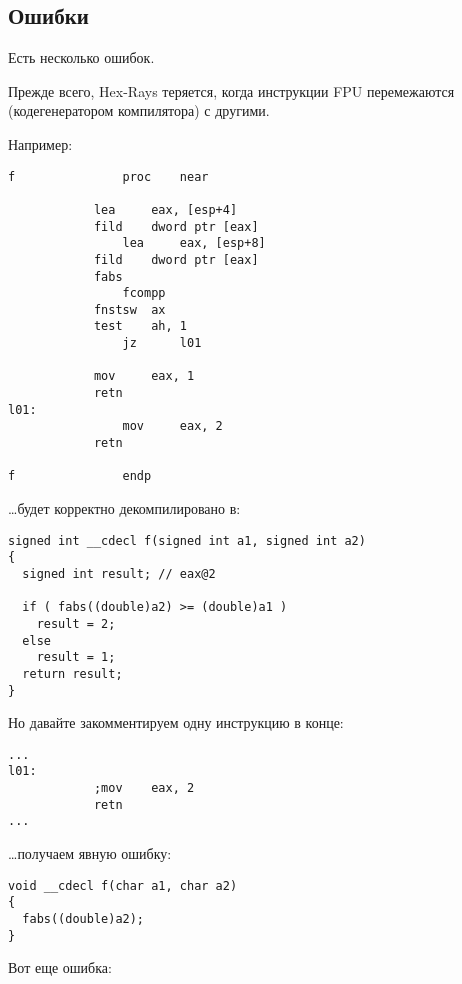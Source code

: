 \label{hex_rays}

\subsection{Ошибки}

Есть несколько ошибок.

Прежде всего, Hex-Rays теряется, когда инструкции \ac{FPU} перемежаются (кодегенератором компилятора) с другими.

Например:

\begin{lstlisting}[style=customasmx86]
f               proc    near

        	lea     eax, [esp+4]
	        fild    dword ptr [eax]
                lea     eax, [esp+8]
        	fild    dword ptr [eax]
	        fabs
                fcompp
        	fnstsw  ax
	        test    ah, 1
                jz      l01

        	mov     eax, 1
	        retn
l01:
                mov     eax, 2
	        retn

f               endp
\end{lstlisting}

\dots будет корректно декомпилировано в:

\begin{lstlisting}[style=customc]
signed int __cdecl f(signed int a1, signed int a2)
{
  signed int result; // eax@2

  if ( fabs((double)a2) >= (double)a1 )
    result = 2;
  else
    result = 1;
  return result;
}
\end{lstlisting}

Но давайте закомментируем одну инструкцию в конце:

\begin{lstlisting}[style=customasmx86]
...
l01:
	        ;mov    eax, 2
        	retn
...
\end{lstlisting}

\dots получаем явную ошибку:

\begin{lstlisting}[style=customc]
void __cdecl f(char a1, char a2)
{
  fabs((double)a2);
}
\end{lstlisting}

Вот еще ошибка:

